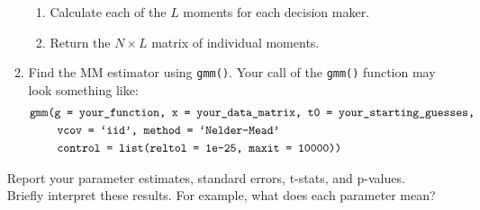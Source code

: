 \documentclass[11pt,letterpaper]{article}\usepackage[]{graphicx}\usepackage[]{xcolor}
\begin{document}
\begin{enumerate}[label=\alph*., leftmargin=*]
\begin{enumerate}[label=\Roman*.]
\begin{enumerate}[label=\roman*.]
			\item Calculate each of the $L$ moments for each decision maker.
			\item Return the $N \times L$ matrix of individual moments.
		\end{enumerate}
		\item Find the MM estimator using \texttt{gmm()}. Your call of the \texttt{gmm()} function may look something like:
		\begin{align*}
			&\text{\texttt{gmm(g = your\_function, x = your\_data\_matrix, t0 = your\_starting\_guesses, }} \\
			&\qquad~ \text{\texttt{vcov = `iid', method = `Nelder-Mead'}} \\
			&\qquad~ \text{\texttt{control = list(reltol = 1e-25, maxit = 10000))}}
		\end{align*}
	\end{enumerate}
	Report your parameter estimates, standard errors, t-stats, and p-values. Briefly interpret these results. For example, what does each parameter mean?


\end{enumerate}
\end{document}
